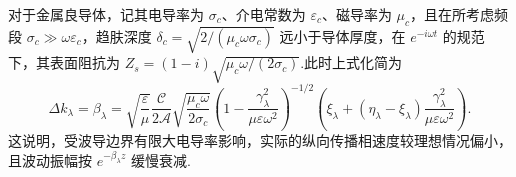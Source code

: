\begin{example}
	对于金属良导体，记其电导率为 \(\sigma_c\)、介电常数为 \(\varepsilon_c\)、磁导率为 \(\mu_c\)，且在所考虑频段 \(\sigma_c \gg \omega\varepsilon_c\)，趋肤深度 \(\delta_c = \sqrt{2/(\mu_c \omega\sigma_c)}\) 远小于导体厚度，在 \(e^{-i\omega t}\) 的规范下，其表面阻抗为 \(Z_s = (1 - i) \sqrt{\mu_c \omega/(2\sigma_c)}\).此时上式化简为
	\begin{equation*}
		\Delta k_{\lambda} = \beta_{\lambda} = \sqrt{\dfrac{\varepsilon}{\mu}} \dfrac{\mathcal{C}}{2 \mathcal{A}} \sqrt{\dfrac{\mu_c \omega}{2\sigma_c}} \left( 1 - \dfrac{\gamma_{\lambda}^2}{\mu\varepsilon\omega^2} \right)^{-1/2} \left( \xi_{\lambda} + (\eta_{\lambda} - \xi_{\lambda}) \dfrac{\gamma_{\lambda}^2}{\mu\varepsilon\omega^2} \right).
	\end{equation*}
	这说明，受波导边界有限大电导率影响，实际的纵向传播相速度较理想情况偏小，且波动振幅按 \(e^{-\beta_{\lambda} z}\) 缓慢衰减.
\end{example}

